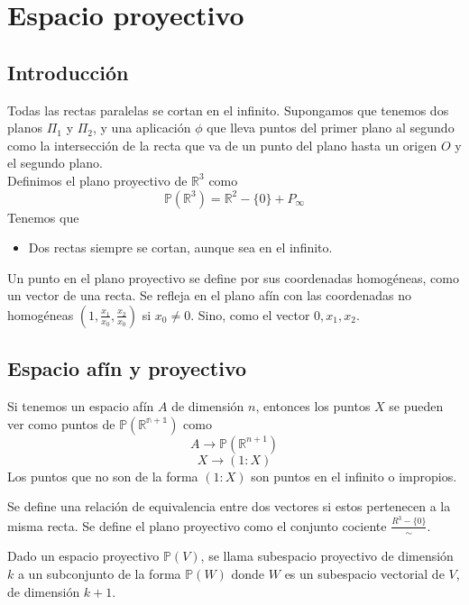 \documentclass{Geometria.tex}
\begin{document}
\chapter{Espacio proyectivo}
\section{Introducción}
Todas las rectas paralelas se cortan en el infinito. Supongamos que tenemos dos planos
\(\Pi_{1}\) y \(\Pi_{2}\), y una aplicación \(\phi \) que lleva puntos del primer plano al segundo
como la intersección de la recta que va de un punto del plano hasta un origen \(O\) y el segundo
plano.\\
Definimos el plano proyectivo de \(\mathbb{R}^{3}\) como
\[
    \mathbb{P}(\mathbb{R}^{3}) = \mathbb{R}^{2} - \{ 0 \} + P_{\infty}
\]
Tenemos que
\begin{itemize}
    \item Dos rectas siempre se cortan, aunque sea en el infinito.
\end{itemize}
Un punto en el plano proyectivo se define por sus coordenadas homogéneas, como un vector de una
recta. Se refleja en el plano afín con las coordenadas no homogéneas \((1, \frac{x_{1}}{x_{0}}
, \frac{x_{2}}{x_{0}})\) si \(x_{0} \neq 0\). Sino, como el vector \(0, x_{1}, x_{2}\).
\section{Espacio afín y proyectivo}
Si tenemos un espacio afín \(A\) de dimensión \(n\), entonces los puntos \(X\) se pueden ver como
puntos de \(\mathbb{P(R^{n+1})}\) como
\[
    A \to  \mathbb{P}(\mathbb{R}^{n+1})
\]
\[
    X \to (1: X)
\]
Los puntos que no son de la forma \((1:X)\) son puntos en el infinito o impropios.
\begin{defin}
    Se define una relación de equivalencia entre dos vectores si estos pertenecen a la misma recta.
    Se define el plano proyectivo como el conjunto cociente \(\frac{R^{3} - \{ 0 \}}{\sim}\).
\end{defin}
\begin{defin}
    Dado un espacio proyectivo \(\mathbb{P}(V)\), se llama subespacio proyectivo de dimensión \(k\)
    a un subconjunto de la forma \(\mathbb{P}(W)\) donde \(W\) es un subespacio vectorial
    de \(V\), de dimensión \(k+1\).
\end{defin}
\end{document}
